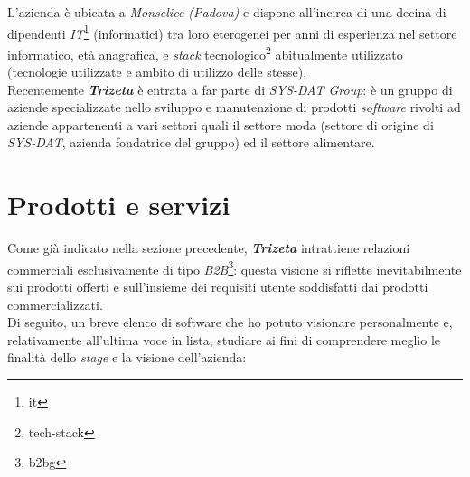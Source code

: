 L'azienda è ubicata a \textit{Monselice (Padova)} e dispone all'incirca di una decina di dipendenti \textit{IT}\footnote{\gls{it}} (informatici) tra loro eterogenei per anni di esperienza nel settore informatico, età anagrafica, e 
\textit{stack} tecnologico\footnote{\gls{tech-stack}} abitualmente utilizzato (tecnologie utilizzate e ambito di utilizzo delle stesse). \\
Recentemente \textit{\textbf{Trizeta}} è entrata a far parte di \textit{SYS-DAT Group}: è un gruppo di aziende specializzate nello sviluppo e manutenzione di prodotti \textit{software} rivolti ad aziende appartenenti a vari settori quali 
il settore moda (settore di origine di \textit{SYS-DAT}, azienda fondatrice del gruppo) ed il settore alimentare. 


\section{Prodotti e servizi}

Come già indicato nella sezione precedente, \textit{\textbf{Trizeta}} intrattiene relazioni commerciali esclusivamente di tipo \textit{B2B}\footnote{\gls{b2bg}}: questa visione si riflette inevitabilmente sui prodotti offerti
e sull'insieme dei requisiti utente soddisfatti dai prodotti commercializzati. \\
Di seguito, un breve elenco di software che ho potuto visionare personalmente e, relativamente all'ultima voce in lista, studiare ai fini di comprendere meglio le finalità dello \textit{stage} e la visione dell'azienda:

